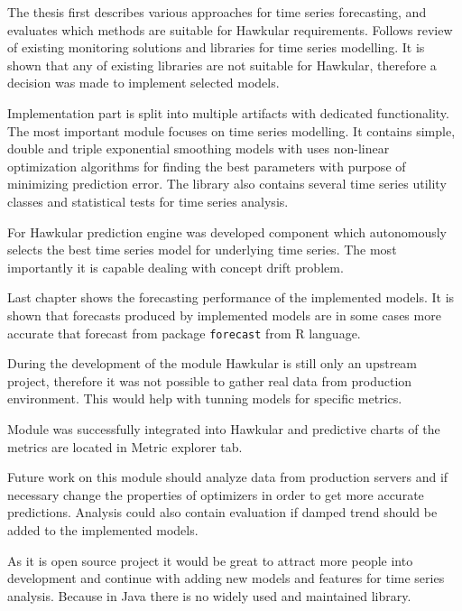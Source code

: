 The thesis first describes various approaches for time series forecasting, and evaluates which methods are suitable
for Hawkular requirements. Follows review of existing monitoring solutions and libraries for time series modelling.
It is shown that any of existing libraries are not suitable for Hawkular, therefore a decision was made to implement
selected models.

Implementation part is split into multiple artifacts with dedicated functionality. The most important module
focuses on time series modelling. It contains simple, double and triple exponential smoothing models with
uses non-linear optimization algorithms for finding the best parameters with purpose of minimizing prediction error.
The library also contains several time series utility classes and statistical tests for time series analysis.

For Hawkular prediction engine was developed component which autonomously selects the best time series model for
underlying time series. The most importantly it is capable dealing with concept drift problem.

Last chapter shows the forecasting performance of the implemented models. It is shown that forecasts produced by
implemented models are in some cases more accurate that forecast from package \texttt{forecast} from R language.

During the development of the module Hawkular is still only an upstream project, therefore it was not possible to
gather real data from production environment. This would help with tunning models for specific metrics.

Module was successfully integrated into Hawkular and predictive charts of the metrics are located in Metric explorer tab.

Future work on this module should analyze data from production servers and if necessary change the properties of
optimizers in order to get more accurate predictions. Analysis could also contain evaluation if damped trend should be
added to the implemented models.

As it is open source project it would be great to attract more people into development and continue with adding new
models and features for time series analysis. Because in Java there is no widely used and maintained library.

